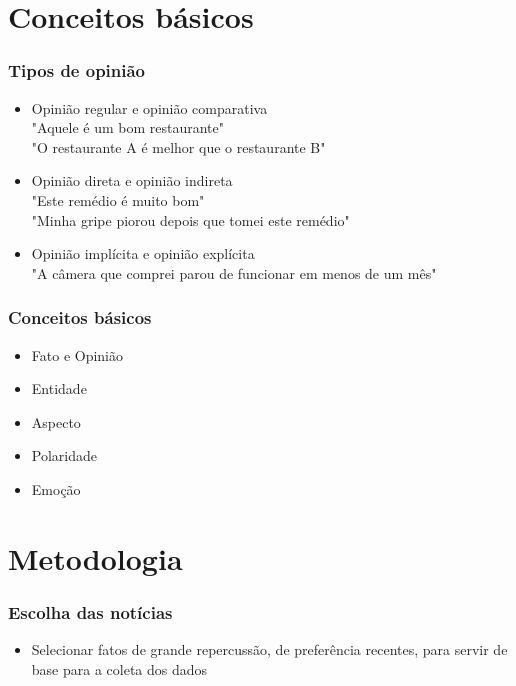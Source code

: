 \documentclass{beamer}
\begin{document}
\section{Conceitos básicos}
\begin{frame}%
\frametitle{\textbf{Tipos de opinião}\transdissolve}%
\begin{itemize}%
\item<1->Opinião regular e opinião comparativa\\
\qquad"Aquele é um bom restaurante"\\
\qquad"O restaurante A é melhor que o restaurante B"\\
\item<2->Opinião direta e opinião indireta\\
\qquad "Este remédio é muito bom"\\
\qquad "Minha gripe piorou depois que tomei este remédio"\\
\item<3->Opinião implícita e opinião explícita\\
\qquad "A câmera que comprei parou de funcionar em menos de um mês"\\
\end{itemize}

\end{frame}

\begin{frame}%
\frametitle{\textbf{Conceitos básicos}\transdissolve}%
\begin{itemize}%
\item<1->Fato e Opinião
\item<2->Entidade
\item<3->Aspecto
\item<4->Polaridade
\item<5->Emoção
\end{itemize}
\end{frame}

\section{Metodologia}

\begin{frame}%
\frametitle{\textbf{Escolha das notícias}\transdissolve}%
\begin{itemize}
    \item Selecionar fatos de grande repercussão, de preferência recentes, para servir de base para a coleta dos dados
\end{itemize}
\end{frame}
\end{document}
